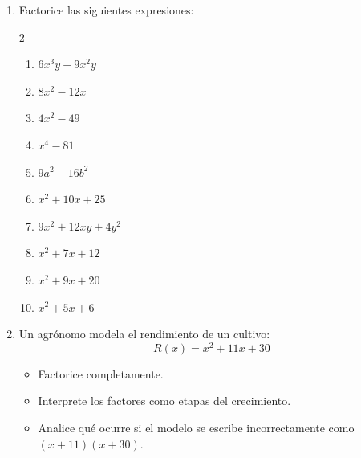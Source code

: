 \documentclass[12pt]{article}
\begin{document}
\begin{enumerate}
		\item Factorice las siguientes expresiones:
		\begin{multicols}{2}
			\begin{enumerate}[label=\alph*)]
				\item $6x^3y + 9x^2y$
				\item $8x^2 - 12x$
				\item $4x^2 - 49$
				\item $x^4 - 81$
				\item $9a^2 - 16b^2$
				\item $x^2 + 10x + 25$
				\item $9x^2 + 12xy + 4y^2$
				\item $x^2 + 7x + 12$
				\item $x^2 + 9x + 20$
				\item $x^2 + 5x + 6$
			\end{enumerate}
		\end{multicols}
		
		
		\item Un agrónomo modela el rendimiento de un cultivo:
		\[
		R(x) = x^2 + 11x + 30
		\]
		
		\begin{itemize}
			\item Factorice completamente.
			\item Interprete los factores como etapas del crecimiento.
			\item Analice qué ocurre si el modelo se escribe incorrectamente como $(x+11)(x+30)$.
		\end{itemize}
		
	\end{enumerate}
	
\end{document}
